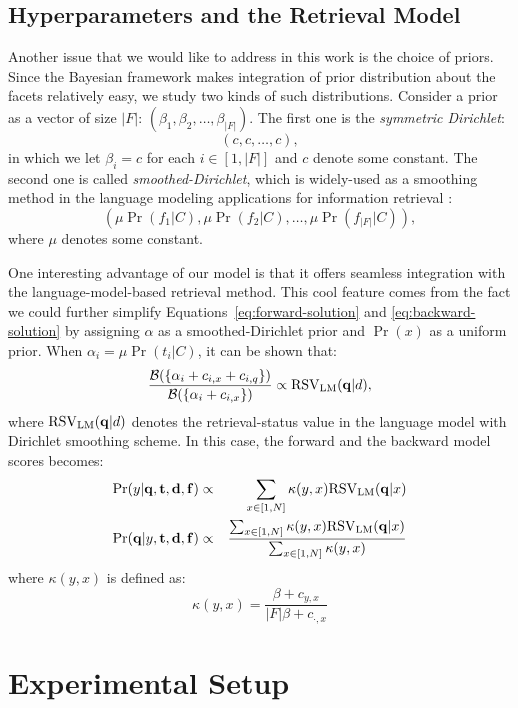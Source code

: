 \subsection{Hyperparameters and the Retrieval Model} \label{ss:integration}

Another issue that we would like to address in this work is the choice of
priors.  Since the Bayesian framework makes integration of prior distribution
about the facets relatively easy, we study two kinds of such distributions.
Consider a prior as a vector of size $|F|$: $(\beta_1, \beta_2, \ldots,
\beta_{|F|})$.  The first one is the \emph{symmetric Dirichlet}: \[ (c, c,
\ldots, c), \] in which we let $\beta_i = c$ for each $i \in [1, |F|]$ and $c$
denote some constant.  The second one is called \emph{smoothed-Dirichlet},
which is widely-used as a smoothing method in the language modeling
applications for information retrieval \cite{zhai2004study}: \[ (\mu
\Pr(f_1|C), \mu \Pr(f_2|C), \ldots, \mu \Pr(f_{|F|}|C)), \] where $\mu$ denotes
some constant.

One interesting advantage of our model is that it offers seamless integration
with the language-model-based retrieval method.  This cool feature comes from
the fact we could further simplify Equations~\eqref{eq:forward-solution} and
\eqref{eq:backward-solution} by assigning $\alpha$ as a smoothed-Dirichlet
prior and $\Pr(x)$ as a uniform prior.  When $\alpha_i = \mu \Pr(t_i|C)$, it
can be shown that: \[ \frac{\mathcal{B}(\{\alpha_i + c_{i,x} + c_{i,q}
\})}{\mathcal{B}(\{\alpha_i + c_{i,x} \})} \propto {\rm RSV}_{\rm
LM}(\mathbf{q}|d), \] where ${\rm RSV}_{\rm LM}(\mathbf{q}|d)$ denotes the
retrieval-status value in the language model with Dirichlet smoothing scheme.
In this case, the forward and the backward model scores becomes:
\begin{eqnarray*}
  \Pr(y|\mathbf{q}, \mathbf{t}, \mathbf{d}, \mathbf{f}) &\propto& 
  \sum_{x \in [1, N]} \kappa(y,x) {\rm RSV}_{\rm LM}(\mathbf{q}|x) \nonumber\\
  \Pr(\mathbf{q}|y, \mathbf{t}, \mathbf{d}, \mathbf{f}) &\propto&
  \frac{\sum_{x \in [1, N]} \kappa(y,x) {\rm RSV}_{\rm LM}(\mathbf{q}|x)} 
  {\sum_{x \in [1, N]} \kappa(y,x)} \nonumber
\end{eqnarray*} where $\kappa(y,x)$ is defined as:
\[ \kappa(y,x) = \frac{\beta + c_{y,x}}{|F|\beta + c_{\cdot,x}} \]

\section{Experimental Setup}\label{s:experimental-setup}

